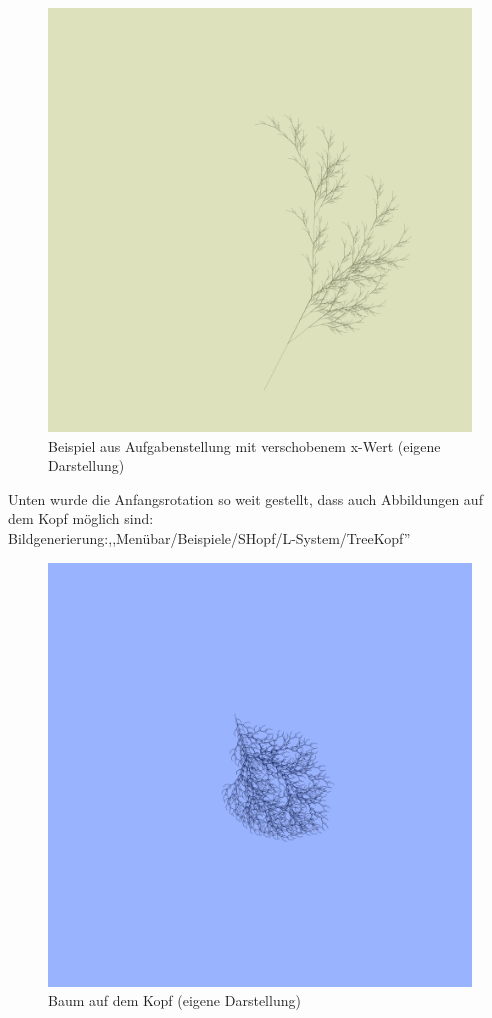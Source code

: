 \documentclass[../mciAusarbeitung.tex]{subfiles}
\begin{document}
\begin{figure}[H]
\begin{minipage}[t]{0.45\linewidth}
				\includegraphics[width=\linewidth]{img/treeRichtung.png}
				\caption[TreeBeispielRichtung]{Beispiel aus Aufgabenstellung mit verschobenem x-Wert (eigene Darstellung)}
			\end{minipage}
		\end{figure}
		\noindent Unten wurde die Anfangsrotation so weit gestellt, dass auch Abbildungen auf dem Kopf möglich sind:\\
		Bildgenerierung:,,Menübar/Beispiele/SHopf/L-System/TreeKopf''\\
		\begin{figure}[H]
			\centering
			\includegraphics[width=0.5\linewidth]{img/treeKopf.png}
			\caption[TreeKopf]{Baum auf dem Kopf (eigene Darstellung)}
		\end{figure}
\end{document}
